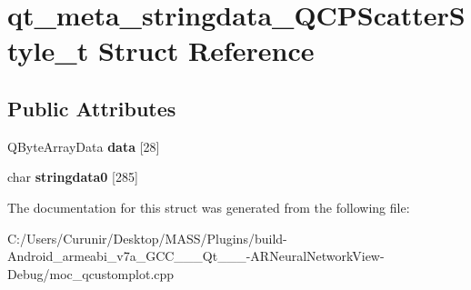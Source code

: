 \hypertarget{structqt__meta__stringdata___q_c_p_scatter_style__t}{}\section{qt\+\_\+meta\+\_\+stringdata\+\_\+\+Q\+C\+P\+Scatter\+Style\+\_\+t Struct Reference}
\label{structqt__meta__stringdata___q_c_p_scatter_style__t}
\subsection*{Public Attributes}
\begin{DoxyCompactItemize}
\item 
\mbox{\label{structqt__meta__stringdata___q_c_p_scatter_style__t_a3d57b627e56a2c6061f326c4918112e0}} 
Q\+Byte\+Array\+Data {\bfseries data} \mbox{[}28\mbox{]}
\item 
\mbox{\label{structqt__meta__stringdata___q_c_p_scatter_style__t_a732506f89f74f1610b04a7906a4d15d4}} 
char {\bfseries stringdata0} \mbox{[}285\mbox{]}
\end{DoxyCompactItemize}


The documentation for this struct was generated from the following file\+:\begin{DoxyCompactItemize}
\item 
C\+:/\+Users/\+Curunir/\+Desktop/\+M\+A\+S\+S/\+Plugins/build-\/\+Android\+\_\+armeabi\+\_\+v7a\+\_\+\+G\+C\+C\+\_\+\_\+\_\+\+Qt\+\_\+\_\+\_-\/\+A\+R\+Neural\+Network\+View-\/\+Debug/moc\+\_\+qcustomplot.\+cpp\end{DoxyCompactItemize}
